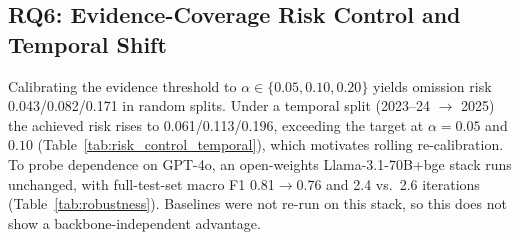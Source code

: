 \begin{table}[t]
\centering
\caption{PLRE comparison including external legal-NLI/precedent-retrieval baselines. External baselines do not use ALERT's goal predicate or validity-interval closure. Point estimates without confidence intervals.}
\label{tab:plre_external}
\small
\setlength{\tabcolsep}{4pt}
\end{table}

\subsection{RQ6: Evidence-Coverage Risk Control and Temporal Shift}

Calibrating the evidence threshold to $\alpha\in\{0.05,0.10,0.20\}$ yields omission risk 0.043/0.082/0.171 in random splits. Under a temporal split (2023--24 $\rightarrow$ 2025) the achieved risk rises to 0.061/0.113/0.196, exceeding the target at $\alpha{=}0.05$ and $0.10$ (Table~\ref{tab:risk_control_temporal}), which motivates rolling re-calibration. To probe dependence on GPT-4o, an open-weights Llama-3.1-70B+bge stack runs unchanged, with full-test-set macro F1 0.81$\rightarrow$0.76 and 2.4 vs.\ 2.6 iterations (Table~\ref{tab:robustness}). Baselines were not re-run on this stack, so this does not show a backbone-independent advantage.
